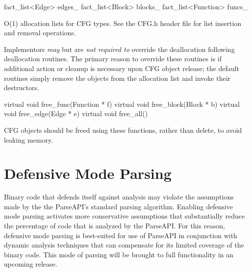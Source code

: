 \documentclass{article}
\newenvironment{apient}{\small\verbatim}{\endverbatim}
\newcommand{\apidesc}[1]{%
{\addtolength{\leftskip}{4em}%
#1\par\medskip}
}
\begin{document}
\begin{apient}
fact_list<Edge> edges_
fact_list<Block> blocks_
fact_list<Function> funcs_
\end{apient}
\apidesc{O(1) allocation lists for CFG types. See the CFG.h header file for list insertion and removal operations.}

Implementors \emph{may} but are \emph{not required to} override the
deallocation following deallocation routines. The primary reason to override
these routines is if additional action or cleanup is necessary upon CFG object
release; the default routines simply remove the objects from the allocation
list and invoke their destructors.

\begin{apient}
virtual void free_func(Function * f)
virtual void free_block(Block * b)
virtual void free_edge(Edge * e)
virtual void free_all()
\end{apient}
\apidesc{CFG objects should be freed using these functions, rather than delete, to avoid leaking memory.}

\section{Defensive Mode Parsing}
\label{sec:defmode}

Binary code that defends itself against analysis may violate the
assumptions made by the the ParseAPI's standard parsing algorithm.
Enabling defensive mode parsing activates more conservative
assumptions that substantially reduce the percentage of code that is
analyzed by the ParseAPI.  For this reason, defensive mode parsing is
best-suited for use of ParseAPI in conjunction with dynamic analysis
techniques that can compensate for its limited coverage of the binary
code.  This mode of parsing will be brought to full functionality in 
an upcoming release.  
\end{document}
